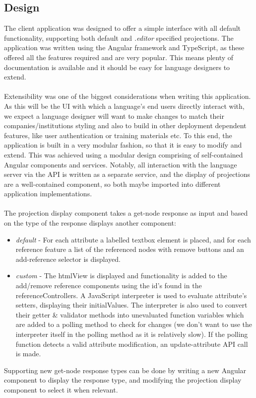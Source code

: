 \documentclass{article}
\begin{document}
{\subsection{Design}
The client application was designed to offer a simple interface with all default functionality, supporting both default and \emph{.editor} specified projections. The application was written using the Angular framework and TypeScript, as these offered all the features required and are very popular. This means plenty of documentation is available and it should be easy for language designers to extend.
\\
\\
Extensibility was one of the biggest considerations when writing this application. As this will be the UI with which a language's end users directly interact with, we expect a language designer will want to make changes to match their companies/institutions styling and also to build in other deployment dependent features, like user authentication or training materials etc. To this end, the application is built in a very modular fashion, so that it is easy to modify and extend. This was achieved using a modular design comprising of self-contained Angular components and services. Notably, all interaction with the language server via the API is written as a separate service, and the display of projections are a well-contained component, so both maybe imported into different application implementations. 
\\
\\
The projection display component takes a get-node response as input and based on the type of the response displays another component:
\begin{itemize}
\item \emph{default} - For each attribute a labelled textbox element is placed, and for each reference feature a list of the referenced nodes with remove buttons and an add-reference selector is displayed.
\item \emph{custom} - The htmlView is displayed and functionality is added to the add/remove reference components using the id's found in the referenceControllers. A JavaScript interpreter is used to evaluate attribute's setters, displaying their initialValues. The interpreter is also used to convert their getter \& validator methods into unevaluated function variables which are added to a polling method to check for changes (we don't want to use the interpreter itself in the polling method as it is relatively slow). If the polling function detects a valid attribute modification, an update-attribute API call is made.
\end{itemize}
Supporting new get-node response types can be done by writing a new Angular component to display the response type, and modifying the projection display component to select it when relevant.
}
\end{document}
